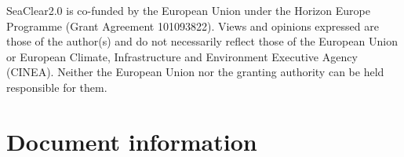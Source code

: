 \documentclass[a4paper,11pt]{article}
\let\oldsection\section
\renewcommand\section{\clearpage\oldsection}
\begin{document}
\begin{center}
    \fontsize{8pt}{7.5pt}\selectfont
    \parbox{\textwidth}{
        SeaClear2.0 is co-funded by the European Union under the Horizon Europe Programme (Grant Agreement 101093822). Views and opinions expressed are those of the author(s) and do not necessarily reflect those of the European Union or European Climate, Infrastructure and Environment Executive Agency (CINEA). Neither the European Union nor the granting authority can be held responsible for them.
    }
\end{center}

\vspace{0.1cm}


\vfill
\thispagestyle{empty}
\pagebreak
\setlength\headheight{66pt}
\pagestyle{fancy}

\section*{Document information}\vspace*{-2mm}
\end{document}
